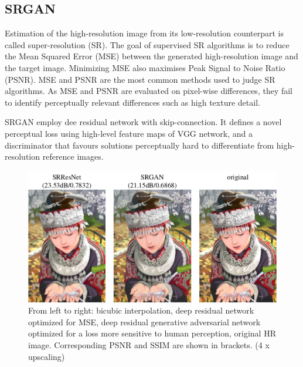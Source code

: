 \begin{onehalfspace}
    \section{SRGAN}
    Estimation of the high-resolution image from its low-resolution counterpart 
    is called super-resolution (SR). The goal of supervised SR algorithms is to 
    reduce the Mean Squared Error (MSE) between the generated high-resolution 
    image and the target image. Minimizing  MSE also maximises Peak Signal to 
    Noise Ratio (PSNR). MSE and PSNR are the most common methods used to judge 
    SR algorithms. 
    As MSE and PSNR are evaluated on pixel-wise differences, they fail to 
    identify perceptually relevant differences such as high texture detail. 

    SRGAN\cite{srgan} employ dee residual network with skip-connection. It defines a novel 
    perceptual loss using high-level feature maps of VGG network, and a 
    discriminator that favours solutions perceptually hard to differentiate 
    from high-resolution reference images.

    \begin{figure}[h]
        \caption{From left to right: bicubic interpolation, deep residual 
        network optimized for MSE, deep residual generative adversarial network 
        optimized for a loss more sensitive to human perception, original 
        HR image. Corresponding PSNR and SSIM are shown in brackets. 
        (4 x upscaling) \cite{srgan}}
        \centering
        \includegraphics[width=0.9\linewidth]{images/srgan.png}
    \end{figure} 

\end{onehalfspace}